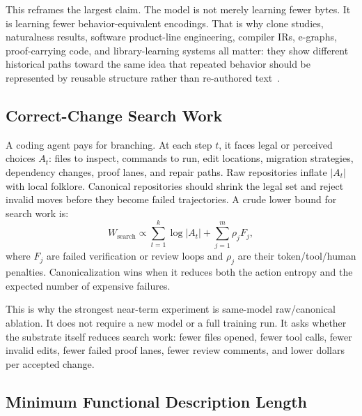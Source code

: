This reframes the largest claim. The model is not merely learning fewer bytes. It is learning fewer behavior-equivalent encodings. That is why clone studies, naturalness results, software product-line engineering, compiler IRs, e-graphs, proof-carrying code, and library-learning systems all matter: they show different historical paths toward the same idea that repeated behavior should be represented by reusable structure rather than re-authored text~\cite{dejavu2017,hindleNaturalness,clementsProductLines,lattnerLLVM,lattnerMLIR,eggEgraphs,proofCarryingCode,dreamcoder}.

\subsection{Correct-Change Search Work}

A coding agent pays for branching. At each step $t$, it faces legal or perceived choices $A_t$: files to inspect, commands to run, edit locations, migration strategies, dependency changes, proof lanes, and repair paths. Raw repositories inflate $|A_t|$ with local folklore. Canonical repositories should shrink the legal set and reject invalid moves before they become failed trajectories. A crude lower bound for search work is:
\begin{equation}
  W_{\mathrm{search}} \propto \sum_{t=1}^{k}\log |A_t| + \sum_{j=1}^{m} \rho_j F_j,
\end{equation}
where $F_j$ are failed verification or review loops and $\rho_j$ are their token/tool/human penalties. Canonicalization wins when it reduces both the action entropy and the expected number of expensive failures.

This is why the strongest near-term experiment is same-model raw/canonical ablation. It does not require a new model or a full training run. It asks whether the substrate itself reduces search work: fewer files opened, fewer tool calls, fewer invalid edits, fewer failed proof lanes, fewer review comments, and lower dollars per accepted change.

\subsection{Minimum Functional Description Length}

